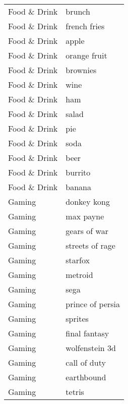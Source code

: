 \begin{supertabular}{l p{0.25\textwidth}}
     Food \& Drink &                             brunch \\
     Food \& Drink &                       french fries \\
     Food \& Drink &                              apple \\
     Food \& Drink &                       orange fruit \\
     Food \& Drink &                           brownies \\
     Food \& Drink &                               wine \\
     Food \& Drink &                                ham \\
     Food \& Drink &                              salad \\
     Food \& Drink &                                pie \\
     Food \& Drink &                               soda \\
     Food \& Drink &                               beer \\
     Food \& Drink &                            burrito \\
     Food \& Drink &                             banana \\
           Gaming &                        donkey kong \\
           Gaming &                          max payne \\
           Gaming &                       gears of war \\
           Gaming &                    streets of rage \\
           Gaming &                            starfox \\
           Gaming &                            metroid \\
           Gaming &                               sega \\
           Gaming &                   prince of persia \\
           Gaming &                            sprites \\
           Gaming &                      final fantasy \\
           Gaming &                     wolfenstein 3d \\
           Gaming &                       call of duty \\
           Gaming &                         earthbound \\
           Gaming &                             tetris \\

\end{supertabular}
